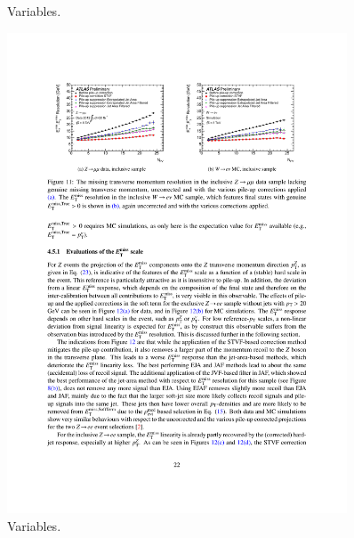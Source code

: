 \begin{figure}[tp]
  \caption{Variables.}
  \label{fig:strategy-objects-electron}
\end{figure}

\begin{figure}[tp]
  \centering
  \includegraphics[width=0.90\textwidth]{figures/performance/met-resolutionvsnpv}
  \caption{Variables.}
  \label{fig:strategy-objects-met-resolution}
\end{figure}

